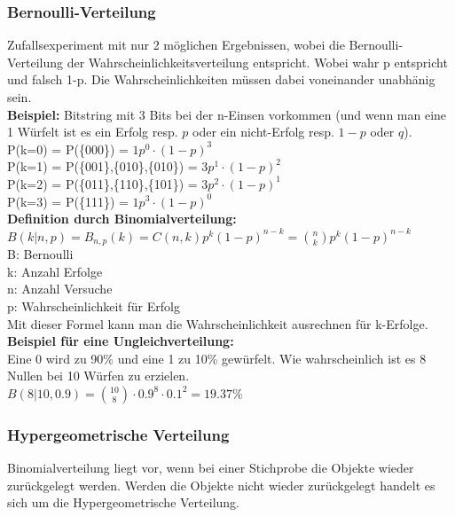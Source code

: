 \documentclass[12pt]{scrartcl}
\begin{document}
\subsubsection{Bernoulli-Verteilung}
Zufallsexperiment mit nur 2 möglichen Ergebnissen, wobei die Bernoulli-Verteilung der 
Wahrscheinlichkeitsverteilung entspricht. Wobei wahr p entspricht und falsch 1-p.
Die Wahrscheinlichkeiten müssen dabei voneinander unabhänig sein.\\

\textbf{Beispiel:}
Bitstring mit 3 Bits bei der n-Einsen vorkommen (und wenn man eine 1 Würfelt ist es ein
Erfolg resp. $p$ oder ein nicht-Erfolg resp. $1-p$ oder $q$).\\

P(k=0) = P(\{000\}) = $1p^0 \cdot (1-p)^3$\\
P(k=1) = P(\{001\},\{010\},\{010\}) = $3p^1 \cdot (1-p)^2$\\
P(k=2) = P(\{011\},\{110\},\{101\}) = $3p^2 \cdot (1-p)^1$\\
P(k=3) = P(\{111\}) = $1p^3 \cdot (1-p)^0$\\

\textbf{Definition durch Binomialverteilung:}\\
$B(k|n,p) = B_{n,p}(k) = C(n,k)p^k(1-p)^{n-k} = \binom{n}{k}p^k(1-p)^{n-k}$\\
B: Bernoulli\\
k: Anzahl Erfolge\\
n: Anzahl Versuche\\
p: Wahrscheinlichkeit für Erfolg\\

Mit dieser Formel kann man die Wahrscheinlichkeit ausrechnen für k-Erfolge.\\


\textbf{Beispiel für eine Ungleichverteilung:}\\
Eine 0 wird zu 90\% und eine 1 zu 10\% gewürfelt. Wie wahrscheinlich ist es 8 Nullen bei
10 Würfen zu erzielen.\\

$B(8|10,0.9) = \binom{10}{8} \cdot 0.9^8 \cdot 0.1^2 = 19.37\%$

\subsubsection{Hypergeometrische Verteilung}
Binomialverteilung liegt vor, wenn bei einer Stichprobe die Objekte wieder zurückgelegt werden.
Werden die Objekte nicht wieder zurückgelegt handelt es sich um die Hypergeometrische Verteilung.\\
\end{document}
